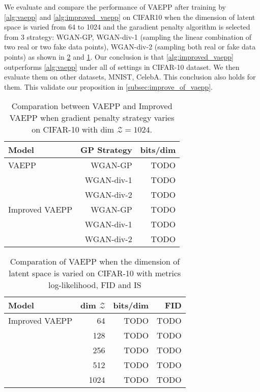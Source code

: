 We evaluate and compare the performance of VAEPP after training by \cref{alg:vaepp} and \cref{alg:improved_vaepp} on CIFAR10 when the dimension of latent space is varied from 64 to 1024 and the garadient penalty algorithm is selected from 3 strategy: WGAN-GP, WGAN-div-1  (sampling the linear combination of two real or two fake data points), WGAN-div-2 (sampling both real or fake data points) as shown in \cref{tab:compare_nD_over_z_dim} and \cref{tab:compare_nD_over_R}. Our conclusion is that \cref{alg:improved_vaepp} outperforms \cref{alg:vaepp} under all of settings in CIFAR-10 dataset. We then evaluate them on other datasets, MNIST, CelebA. This conclusion also holds for them. This validate our proposition in \cref{subsec:improve_of_vaepp}. 

\begin{table}[tb]
\centering
\begin{tabular}{lrr}  
\toprule
Model  &  GP Strategy  &  bits/dim \\
\midrule
VAEPP            &  WGAN-GP   & TODO      \\
                 &  WGAN-div-1  & TODO      \\
                 &  WGAN-div-2  & TODO      \\
Improved VAEPP   &  WGAN-GP   & TODO      \\
                 &  WGAN-div-1  & TODO     \\
                 &  WGAN-div-2  & TODO      \\
\bottomrule
\end{tabular}
\caption{Comparation between VAEPP and Improved VAEPP when gradient penalty strategy varies on CIFAR-10 with dim $\mathcal{Z} = 1024$. }
\label{tab:compare_nD_over_R}
\end{table}

\begin{table}[tb]
\centering
\begin{tabular}{lrrr}  
\toprule
Model  &  dim $\mathcal{Z}$  &  bits/dim  & FID \\
\midrule
Improved VAEPP   &  64   & TODO  & TODO     \\
                 &  128  & TODO  & TODO     \\
                 &  256  & TODO  & TODO     \\
                 &  512  & TODO  & TODO     \\
                 &  1024 & TODO  & TODO     \\
\bottomrule
\end{tabular}
\caption{Comparation of VAEPP when the dimension of latent space is varied on CIFAR-10 with metrics log-likelihood, FID and IS}
\label{tab:compare_nD_over_z_dim}
\end{table}

